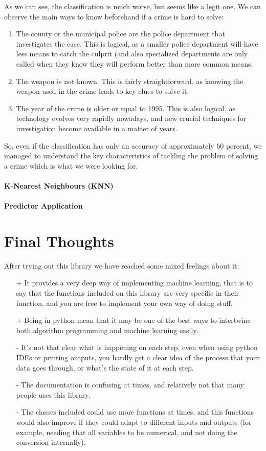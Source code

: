 \documentclass[12pt]{report}
\begin{document}
As we can see, the classification is much worse, but seems like a legit one. We can observe the main ways to know beforehand if a crime is hard to solve:
\begin{enumerate}
\item The county or the municipal police are the police department that investigates the case. This is logical, as a smaller police department will have less means to catch the culprit (and also specialized departments are only called when they know they will perform better than more common means.
\item The weapon is not known. This is fairly straightforward, as knowing the weapon used in the crime leads to key clues to solve it.
\item The year of the crime is older or equal to 1995. This is also logical, as technology evolves very rapidly nowadays, and new crucial techniques for investigation become available in a matter of years.
\end{enumerate}

So, even if the classification has only an accuracy of approximately 60 percent, we managed to understand the key characteristics of tackling the problem of solving a crime which is what we were looking for.

\paragraph{K-Nearest Neighbours (KNN)}

\paragraph{Predictor Application}

\section{Final Thoughts} 
After trying out this library we have reached some mixed feelings about it:
\begin{itemize}
\item[+] It provides a very deep way of implementing machine learning, that is to say that the functions included on this library are very specific in their function, and you are free to implement your own way of doing stuff.
\item[+] Being in python mean that it may be one of the best ways to intertwine both algorithm programming and machine learning easily.
\item[-] It's not that clear what is happening on each step, even when using python IDEs or printing outputs, you hardly get a clear idea of the process that your data goes through, or what's the state of it at each step.
\item[-] The documentation is confusing at times, and relatively not that many people uses this library.
\item[-] The classes included could use more functions at times, and this functions would also improve if they could adapt to different inputs and outputs (for example, needing that all variables to be numerical, and not doing the conversion internally).
\end{itemize}
\end{document}
